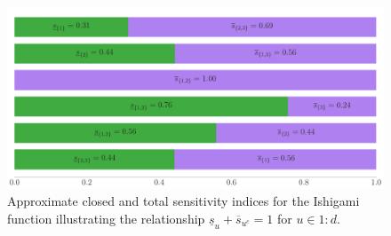 \documentclass{article}[12pt]
\begin{document}
\begin{figure}[H]
    \centering
    \includegraphics[width=.8\textwidth]{figs/ishigami.pdf}
    \caption{Approximate closed and total sensitivity indices for the Ishigami function illustrating the relationship $\underline{s}_u + \overline{s}_{u^c} = 1$ for $u \in 1:d$.}
    \label{fig:ishigami}
\end{figure}




\printbibliography
\end{document}
